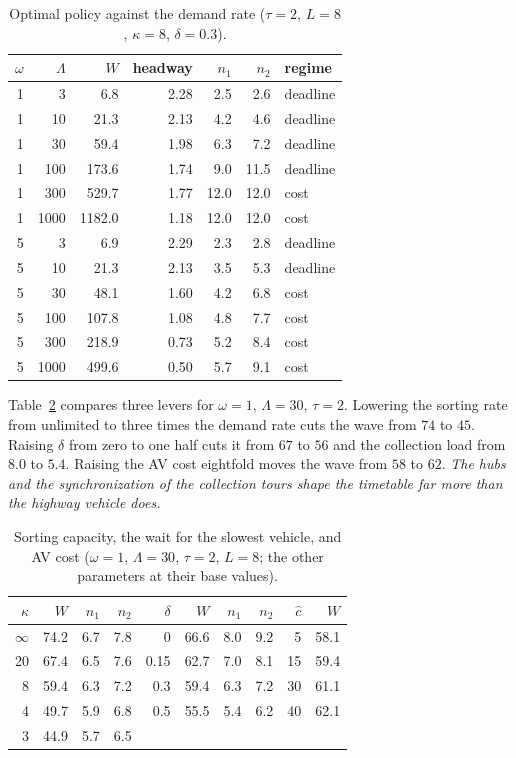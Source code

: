 \documentclass[10pt, reqno]{amsart}
\theoremstyle{definition}
\begin{document}
\begin{table}[h]
\centering
\caption{Optimal policy against the demand rate ($\tau=2$, $L=8$, $\kappa=8$, $\delta=0.3$).}\label{tab:lambda}
\begin{tabular}{rrrrrrl}
\toprule
$\omega$ & $\Lambda$ & $W$ & headway & $n_1$ & $n_2$ & regime\\
\midrule
1 & 3 & 6.8 & 2.28 & 2.5 & 2.6 & deadline\\
1 & 10 & 21.3 & 2.13 & 4.2 & 4.6 & deadline\\
1 & 30 & 59.4 & 1.98 & 6.3 & 7.2 & deadline\\
1 & 100 & 173.6 & 1.74 & 9.0 & 11.5 & deadline\\
1 & 300 & 529.7 & 1.77 & 12.0 & 12.0 & cost\\
1 & 1000 & 1182.0 & 1.18 & 12.0 & 12.0 & cost\\
\midrule
5 & 3 & 6.9 & 2.29 & 2.3 & 2.8 & deadline\\
5 & 10 & 21.3 & 2.13 & 3.5 & 5.3 & deadline\\
5 & 30 & 48.1 & 1.60 & 4.2 & 6.8 & cost\\
5 & 100 & 107.8 & 1.08 & 4.8 & 7.7 & cost\\
5 & 300 & 218.9 & 0.73 & 5.2 & 8.4 & cost\\
5 & 1000 & 499.6 & 0.50 & 5.7 & 9.1 & cost\\
\bottomrule
\end{tabular}
\end{table}

Table~\ref{tab:hub} compares three levers for $\omega=1$, $\Lambda=30$, $\tau=2$. Lowering the sorting rate from unlimited to three times the demand rate cuts the wave from $74$ to $45$. Raising $\delta$ from zero to one half cuts it from $67$ to $56$ and the collection load from $8.0$ to $5.4$. Raising the AV cost eightfold moves the wave from $58$ to $62$. \emph{The hubs and the synchronization of the collection tours shape the timetable far more than the highway vehicle does.}

\begin{table}[h]
\centering
\caption{Sorting capacity, the wait for the slowest vehicle, and AV cost ($\omega=1$, $\Lambda=30$, $\tau=2$, $L=8$; the other parameters at their base values).}\label{tab:hub}
\begin{tabular}{rrrr@{\hskip 2.5em}rrrr@{\hskip 2.5em}rr}
\toprule
$\kappa$ & $W$ & $n_1$ & $n_2$ & $\delta$ & $W$ & $n_1$ & $n_2$ & $\hat c$ & $W$\\
\midrule
$\infty$ & 74.2 & 6.7 & 7.8 & 0 & 66.6 & 8.0 & 9.2 & 5 & 58.1\\
20 & 67.4 & 6.5 & 7.6 & 0.15 & 62.7 & 7.0 & 8.1 & 15 & 59.4\\
8 & 59.4 & 6.3 & 7.2 & 0.3 & 59.4 & 6.3 & 7.2 & 30 & 61.1\\
4 & 49.7 & 5.9 & 6.8 & 0.5 & 55.5 & 5.4 & 6.2 & 40 & 62.1\\
3 & 44.9 & 5.7 & 6.5 & & & & & & \\
\bottomrule
\end{tabular}
\end{table}
\end{document}
